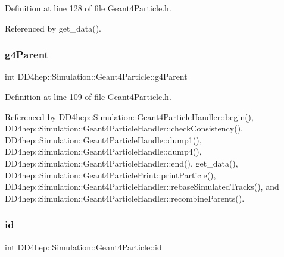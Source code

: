 Definition at line 128 of file Geant4\+Particle.\+h.



Referenced by get\+\_\+data().

\hypertarget{class_d_d4hep_1_1_simulation_1_1_geant4_particle_a0a8fe0ae8782e18a88f1dd44556de52b}{}\label{class_d_d4hep_1_1_simulation_1_1_geant4_particle_a0a8fe0ae8782e18a88f1dd44556de52b} 
\subsubsection{\texorpdfstring{g4\+Parent}{g4Parent}}
{\footnotesize\ttfamily int D\+D4hep\+::\+Simulation\+::\+Geant4\+Particle\+::g4\+Parent}



Definition at line 109 of file Geant4\+Particle.\+h.



Referenced by D\+D4hep\+::\+Simulation\+::\+Geant4\+Particle\+Handler\+::begin(), D\+D4hep\+::\+Simulation\+::\+Geant4\+Particle\+Handler\+::check\+Consistency(), D\+D4hep\+::\+Simulation\+::\+Geant4\+Particle\+Handle\+::dump1(), D\+D4hep\+::\+Simulation\+::\+Geant4\+Particle\+Handle\+::dump4(), D\+D4hep\+::\+Simulation\+::\+Geant4\+Particle\+Handler\+::end(), get\+\_\+data(), D\+D4hep\+::\+Simulation\+::\+Geant4\+Particle\+Print\+::print\+Particle(), D\+D4hep\+::\+Simulation\+::\+Geant4\+Particle\+Handler\+::rebase\+Simulated\+Tracks(), and D\+D4hep\+::\+Simulation\+::\+Geant4\+Particle\+Handler\+::recombine\+Parents().

\hypertarget{class_d_d4hep_1_1_simulation_1_1_geant4_particle_acc6eea6683706e87e8b769c94caf3cd2}{}\label{class_d_d4hep_1_1_simulation_1_1_geant4_particle_acc6eea6683706e87e8b769c94caf3cd2} 
\subsubsection{\texorpdfstring{id}{id}}
{\footnotesize\ttfamily int D\+D4hep\+::\+Simulation\+::\+Geant4\+Particle\+::id}



